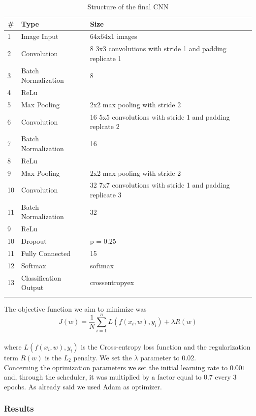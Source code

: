 \documentclass[12pt, a4paper]{report}
\begin{document}
\begin{table}[h!]
	\centering
	\caption{Structure of the final CNN}
	\begin{tabular}{lll}
		\# & Type & Size \\
		\midrule
		1 & Image Input & 64x64x1 images \\
		2 & Convolution & 8 3x3 convolutions with stride 1 and padding replicate 1 \\
		3 & Batch Normalization & 8 \\
		4 & ReLu & \\
		5 & Max Pooling & 2x2 max pooling with stride 2 \\
		6 & Convolution & 16 5x5 convolutions with stride 1 and padding replcate 2 \\
		7 & Batch Normalization & 16 \\
		8 & ReLu & \\
		9 & Max Pooling & 2x2 max pooling with stride 2 \\
		10 & Convolution & 32 7x7 convolutions with stride 1 and padding replicate 3 \\
		11 & Batch Normalization & 32 \\
		9 & ReLu & \\
		10 & Dropout & p = 0.25 \\
		11 & Fully Connected & 15 \\
		12 & Softmax & softmax \\
		13 & Classification Output & crossentropyex \\
		\bottomrule
		\label{tab:final}
	\end{tabular}
\end{table}

The objective function we aim to minimize was 
$$J(w) = \frac 1 N \sum_{i=1}^n L(f(x_i, w), y_i) + \lambda R(w)$$\\
where $L(f(x_i, w), y_i)$ is the Cross-entropy loss function and the regularization term $R(w)$ is the $L_2$ penalty. We set the $\lambda$ parameter to $0.02$.\\
Concerning the oprimization parameters we set the initial learning rate to $0.001$ and, through the scheduler, it was multiplied by a factor equal to $0.7$ every $3$ epochs. As already said we used Adam as optimizer.\\

\subsubsection*{Results}
\end{document}
